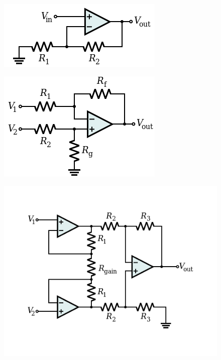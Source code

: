 \begin{figure}[!h]
    \centering
    \begin{minipage}{.23\textwidth}
        \centering
        \includegraphics[width=.8\linewidth]{Figures/Op-Amp_Non-Inverting_Amplifier}
        \label{fig:opamp-non-inverting}
    \end{minipage}
    \begin{minipage}{.23\textwidth}
        \centering
        \includegraphics[width=.8\linewidth]{Figures/Op-Amp_Differential_Amplifier}
        \label{fig:opamp-differential}
    \end{minipage}
    \begin{minipage}{.23\textwidth}
        \centering
        \includegraphics[width=0.9\linewidth]{Figures/Op-Amp_Instrumentation_Amplifier}

\end{minipage}
\end{figure}
